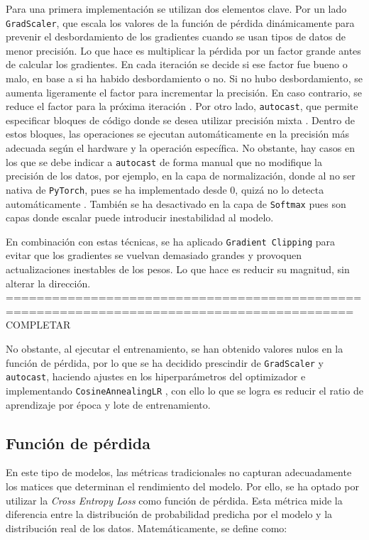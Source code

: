 \documentclass[11pt]{book}
\theoremstyle{plain}
\theoremstyle{definition}
\begin{document}
Para una primera implementación se utilizan dos elementos clave. Por un lado \texttt{GradScaler}, que escala los valores de la función de pérdida dinámicamente para prevenir el desbordamiento de los gradientes cuando se usan tipos de datos de menor precisión. Lo que hace es multiplicar la pérdida por un factor grande antes de calcular los gradientes. En cada iteración se decide si ese factor fue bueno o malo, en base a si ha habido desbordamiento o no. Si no hubo desbordamiento, se aumenta ligeramente el factor para incrementar la precisión. En caso contrario, se reduce el factor para la próxima iteración \parencite{amit2024mixedprecision}. Por otro lado, \texttt{autocast}, que permite especificar bloques de código donde se desea utilizar precisión mixta \parencite{stack_overflow_gradscaler}. Dentro de estos bloques, las operaciones se ejecutan automáticamente en la precisión más adecuada según el hardware y la operación específica. No obstante, hay casos en los que se debe indicar a \texttt{autocast} de forma manual que no modifique la precisión de los datos, por ejemplo, en la capa de normalización, donde al no ser nativa de \texttt{PyTorch}, pues se ha implementado desde 0, quizá no lo detecta automáticamente \parencite{amit2024mixedprecision}. También se ha desactivado en la capa de \texttt{Softmax} pues son capas donde escalar puede introducir inestabilidad al modelo.

En combinación con estas técnicas, se ha aplicado \texttt{Gradient Clipping} para evitar que los gradientes se vuelvan demasiado grandes y provoquen actualizaciones inestables de los pesos. Lo que hace es reducir su magnitud, sin alterar la dirección. 
===========================================================================================
COMPLETAR

No obstante, al ejecutar el entrenamiento, se han obtenido valores nulos en la función de pérdida, por lo que se ha decidido prescindir de \texttt{GradScaler} y \texttt{autocast}, haciendo ajustes en los hiperparámetros del optimizador e implementando \texttt{CosineAnnealingLR} \parencite{pytorch_cosineannealinglr}, con ello lo que se logra es reducir el ratio de aprendizaje por época y lote de entrenamiento. 

\subsection{Función de pérdida}

En este tipo de modelos, las métricas tradicionales no capturan adecuadamente los matices que determinan el rendimiento del modelo. Por ello, se ha optado por utilizar la \textit{Cross Entropy Loss} como función de pérdida. Esta métrica mide la diferencia entre la distribución de probabilidad predicha por el modelo y la distribución real de los datos. 
Matemáticamente, se define como:
\end{document}
